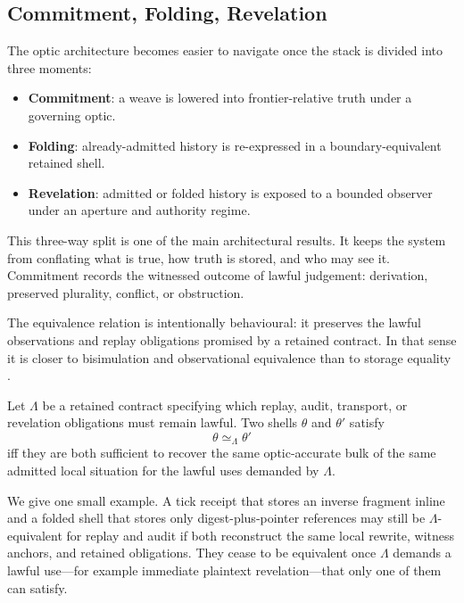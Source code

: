 \documentclass{aion}
\begin{document}
\subsection{Commitment, Folding, Revelation}
\label{subsec:commit-fold-reveal}

The optic architecture becomes easier to navigate once the stack is divided
into three moments:

\begin{itemize}[leftmargin=*]
	\item \textbf{Commitment}: a weave is lowered into
	      frontier-relative truth under a governing optic.
	\item \textbf{Folding}: already-admitted history is re-expressed in a
	      boundary-equivalent retained shell.
	\item \textbf{Revelation}: admitted or folded history is exposed to a bounded
	      observer under an aperture and authority regime.
\end{itemize}

	This three-way split is one of the main architectural results. It
	keeps the system from conflating what is true, how truth is stored, and who may
	see it.
	Commitment records the witnessed outcome of lawful judgement: derivation,
	preserved plurality, conflict, or obstruction.

	The equivalence relation is intentionally behavioural: it preserves the
	lawful observations and replay obligations promised by a retained contract. In
	that sense it is closer to bisimulation and observational equivalence than to
	storage equality \cite{Park1981,Milner1989}.

\begin{definition}
\label{def:shell-equivalence}
	Let \(\Lambda\) be a retained contract specifying which replay, audit,
	transport, or revelation obligations must remain lawful. Two shells
	\(\theta\) and \(\theta'\) satisfy
	\[
		\theta \simeq_{\Lambda} \theta'
	\]
	iff they are both sufficient to recover the same optic-accurate bulk of the
	same admitted local situation for the lawful uses demanded by \(\Lambda\).
\end{definition}

We give one small example. A tick receipt that stores an inverse fragment inline
and a folded shell that stores only digest-plus-pointer references may still be
\(\Lambda\)-equivalent for replay and audit if both reconstruct the same local
rewrite, witness anchors, and retained obligations. They cease to be equivalent
once \(\Lambda\) demands a lawful use---for example immediate plaintext
revelation---that only one of them can satisfy.
\end{document}
